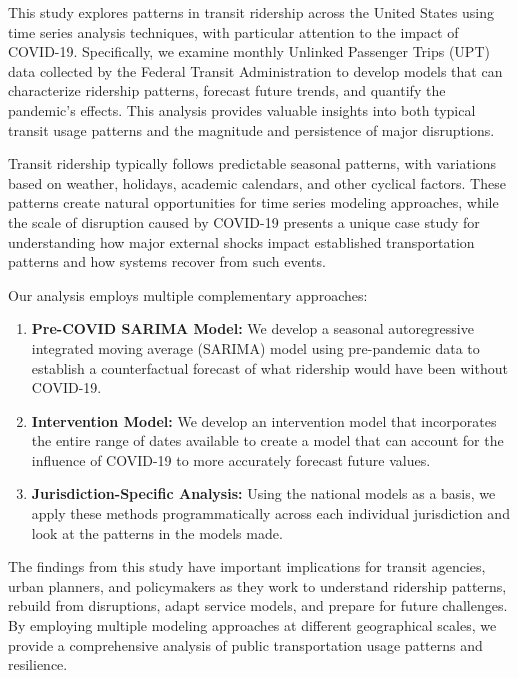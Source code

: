 \documentclass[11pt]{article}
\begin{document}
This study explores patterns in transit ridership across the United States using time series analysis techniques, with particular attention to the impact of COVID-19. Specifically, we examine monthly Unlinked Passenger Trips (UPT) data collected by the Federal Transit Administration to develop models that can characterize ridership patterns, forecast future trends, and quantify the pandemic's effects. This analysis provides valuable insights into both typical transit usage patterns and the magnitude and persistence of major disruptions.

Transit ridership typically follows predictable seasonal patterns, with variations based on weather, holidays, academic calendars, and other cyclical factors. These patterns create natural opportunities for time series modeling approaches, while the scale of disruption caused by COVID-19 presents a unique case study for understanding how major external shocks impact established transportation patterns and how systems recover from such events.

Our analysis employs multiple complementary approaches:

\begin{enumerate}
  \item \textbf{Pre-COVID SARIMA Model:} We develop a seasonal autoregressive integrated moving average (SARIMA) model using pre-pandemic data to establish a counterfactual forecast of what ridership would have been without COVID-19.
  
  \item \textbf{Intervention Model:} We develop an intervention model that incorporates the entire range of dates available to create a model that can account for the influence of COVID-19 to more accurately forecast future values.
  
  \item \textbf{Jurisdiction-Specific Analysis:} Using the national models as a basis, we apply these methods programmatically across each individual jurisdiction and look at the patterns in the models made.
  
\end{enumerate}

The findings from this study have important implications for transit agencies, urban planners, and policymakers as they work to understand ridership patterns, rebuild from disruptions, adapt service models, and prepare for future challenges. By employing multiple modeling approaches at different geographical scales, we provide a comprehensive analysis of public transportation usage patterns and resilience.
\end{document}
